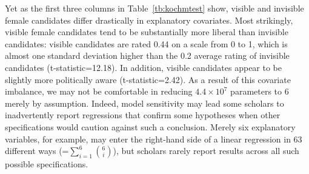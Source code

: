 \documentclass[11pt,letterpaper]{article}
\theoremstyle{plain}
\begin{document}
Yet as the first three columns in Table~\ref{tb:kochmtest} show,
visible and invisible female candidates differ drastically in
explanatory covariates.  Most strikingly, visible female candidates
tend to be substantially more liberal than invisible candidates:
visible candidates are rated 0.44 on a scale from 0 to 1, which is
almost one standard deviation higher than the 0.2 average rating of
invisible candidates (t-statistic=12.18).  In addition, visible
candidates appear to be slightly more politically aware
(t-statistic=2.42).  As a result of this covariate imbalance, we may
not be comfortable in reducing $4.4 \times 10^7$ parameters to 6
merely by assumption.  Indeed, model sensitivity may lead some
scholars to inadvertently report regressions that confirm some
hypotheses when other specifications would caution against such a
conclusion.  Merely six explanatory variables, for example, may enter
the right-hand side of a linear regression in 63 different ways
(=$\sum_{i=1}^6 {6 \choose i}$), but scholars rarely report results
across all such possible specifications.
\end{document}
